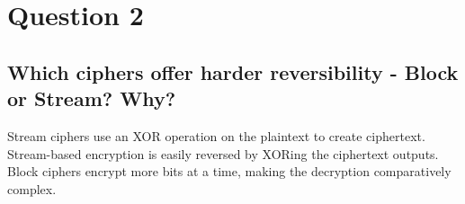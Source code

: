 \documentclass{report}
\begin{document}
	\section{Question 2}
	\startsection
		\renewcommand{\thesubsection}{\thesection.\Alph{subsection}}
		\subsection{Which ciphers offer harder reversibility - Block or Stream? Why?}
		\startsubsection
			Stream ciphers use an XOR operation on the plaintext to create ciphertext. Stream-based encryption is easily reversed by XORing the ciphertext outputs. Block ciphers encrypt more bits at a time, making the decryption comparatively complex.
		\closesection
	\closesection
\end{document}
